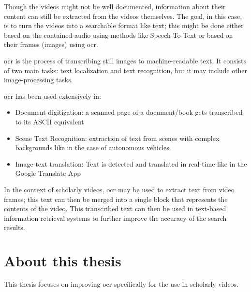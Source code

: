 Though the videos might not be well documented, information about their content can still be extracted from the videos themselves. The goal, in this case, is to turn the videos into a searchable format like text; this might be done either based on the contained audio using methods like Speech-To-Text or based on their frames (images) using \gls{ocr}.

\gls{ocr} is the process of transcribing still images to machine-readable text. It consists of two main tasks: text localization and text recognition, but it may include other image-processing tasks.


\gls{ocr} has been used extensively in:
\begin{itemize}
    \item Document digitization: a scanned page of a document/book gets transcribed to its ASCII equivalent
    \item Scene Text Recognition: extraction of text from scenes with complex backgrounds like in the case of autonomous vehicles.
    \item Image text translation: Text is detected and translated in real-time like in the Google Translate App
\end{itemize}

In the context of scholarly videos, \gls{ocr} may be used to extract text from video frames; this text can then be merged into a single block that represents the contents of the video.
This transcribed text can then be used in text-based information retrieval systems to further improve the accuracy of the search results.

\section{About this thesis}

This thesis focuses on improving \gls{ocr} specifically for the use in scholarly videos.